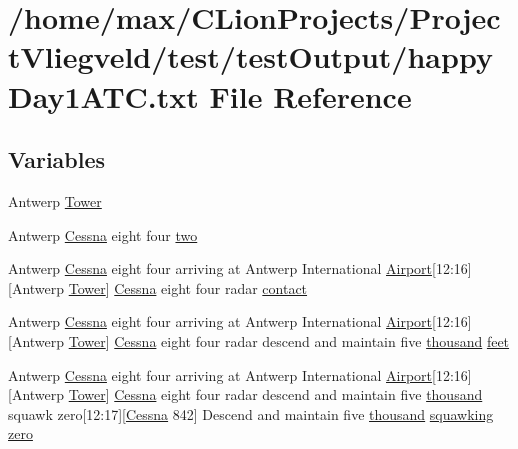 \hypertarget{happyDay1ATC_8txt}{}\section{/home/max/\+C\+Lion\+Projects/\+Project\+Vliegveld/test/test\+Output/happy\+Day1\+A\+TC.txt File Reference}
\label{happyDay1ATC_8txt}
\subsection*{Variables}
\begin{DoxyCompactItemize}
\item 
Antwerp \hyperlink{happyDay1ATC_8txt_a1eb79599ee2cca5bc8c8adc87a257c7c}{Tower}
\item 
Antwerp \hyperlink{test_2testOutput_2log_8txt_a3de326468ae3f37941c91ae68853a1af}{Cessna} eight four \hyperlink{happyDay1ATC_8txt_aa0469efe401676f277c03bf9d9d4a983}{two}
\item 
Antwerp \hyperlink{test_2testOutput_2log_8txt_a3de326468ae3f37941c91ae68853a1af}{Cessna} eight four arriving at Antwerp International \hyperlink{classAirport}{Airport}\mbox{[}12\+:16\mbox{]}\mbox{[}Antwerp \hyperlink{test_2testOutput_2log_8txt_ade5c2a9317c664c53d015e41bdc32393}{Tower}\mbox{]} \hyperlink{test_2testOutput_2log_8txt_a3de326468ae3f37941c91ae68853a1af}{Cessna} eight four radar \hyperlink{happyDay1ATC_8txt_aabccce409c3b74e74ea0c068d4a73f10}{contact}
\item 
Antwerp \hyperlink{test_2testOutput_2log_8txt_a3de326468ae3f37941c91ae68853a1af}{Cessna} eight four arriving at Antwerp International \hyperlink{classAirport}{Airport}\mbox{[}12\+:16\mbox{]}\mbox{[}Antwerp \hyperlink{test_2testOutput_2log_8txt_ade5c2a9317c664c53d015e41bdc32393}{Tower}\mbox{]} \hyperlink{test_2testOutput_2log_8txt_a3de326468ae3f37941c91ae68853a1af}{Cessna} eight four radar descend and maintain five \hyperlink{happyDay5ExpectedATC_8txt_a429913a0643fe14faca3dca538caa7bb}{thousand} \hyperlink{happyDay1ATC_8txt_adb5a296986a5b6019ec88f520f243c26}{feet}
\item 
Antwerp \hyperlink{test_2testOutput_2log_8txt_a3de326468ae3f37941c91ae68853a1af}{Cessna} eight four arriving at Antwerp International \hyperlink{classAirport}{Airport}\mbox{[}12\+:16\mbox{]}\mbox{[}Antwerp \hyperlink{test_2testOutput_2log_8txt_ade5c2a9317c664c53d015e41bdc32393}{Tower}\mbox{]} \hyperlink{test_2testOutput_2log_8txt_a3de326468ae3f37941c91ae68853a1af}{Cessna} eight four radar descend and maintain five \hyperlink{happyDay5ExpectedATC_8txt_a429913a0643fe14faca3dca538caa7bb}{thousand} squawk zero\mbox{[}12\+:17\mbox{]}\mbox{[}\hyperlink{test_2testOutput_2log_8txt_a3de326468ae3f37941c91ae68853a1af}{Cessna} 842\mbox{]} Descend and maintain five \hyperlink{happyDay5ExpectedATC_8txt_a429913a0643fe14faca3dca538caa7bb}{thousand} \hyperlink{test_2testOutput_2log_8txt_a890147ec88e2d9518adf949981616843}{squawking} \hyperlink{happyDay1ATC_8txt_adce466d7618784129bcb0feb6d2d98e4}{zero}

\end{DoxyCompactItemize}
